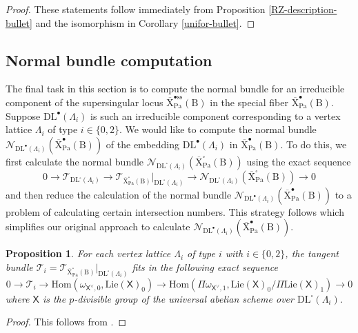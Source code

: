 \documentclass[10pt]{amsart}
\numberwithin{equation}{section}
\newtheorem{proposition}[equation]{Proposition}
\theoremstyle{definition}
\def\Lie{\mathrm{Lie}}
\def\Pa{\mathrm{Pa}}
\def\calN{\mathcal{N}}
\def\calT{\mathcal{T}}
\def\sfX{\mathsf{X}}
\def\rmB{\mathrm{B}}
\def\rmX{\mathrm{X}}
\begin{document}
\begin{proof}
These statements follow immediately from Proposition \ref{RZ-description-bullet} and the isomorphism in Corollary \ref{unifor-bullet}.
\end{proof}


\subsection{Normal bundle computation}
The final task in this section is to compute the normal bundle for an irreducible component of the supersingular locus $\overline{\rmX}^{\bullet\mathrm{ss}}_{\Pa}(\rmB)$ in the special fiber $\overline{\rmX}^{\bullet}_{\Pa}(\rmB)$. Suppose $\mathrm{DL}^{\bullet}(\Lambda_{i})$ is  such an irreducible component corresponding to a vertex lattice $\Lambda_{i}$ of type $i\in\{0, 2\}$. We would like to compute the normal bundle $\calN_{\mathrm{DL}^{\bullet}(\Lambda_{i})}({\overline{\rmX}^{\bullet}_{\Pa}(\rmB)})$ of the embedding $\mathrm{DL}^{\bullet}(\Lambda_{i})$ in $\overline{\rmX}^{\bullet}_{\Pa}(\rmB)$. To do this, we first calculate the normal bundle $\calN_{\mathrm{DL}^{\square}(\Lambda_{i})}({\overline{\rmX}^{\square}_{\Pa}(\rmB)})$ using the exact sequence 
\begin{equation*}
0\rightarrow \calT_{\mathrm{DL}^{\square}(\Lambda_{i})}\rightarrow \calT_{\overline{\rmX}^{\square}_{\Pa}(\rmB)}\vert_{\mathrm{DL}^{\square}(\Lambda_{i})}\rightarrow \calN_{\mathrm{DL}^{\square}(\Lambda_{i})}({\overline{\rmX}^{\square}_{\Pa}(\rmB)})\rightarrow 0
\end{equation*}
and then reduce the calculation of the normal bundle $ \calN_{\mathrm{DL}^{\bullet}(\Lambda_{i})}({\overline{\rmX}^{\bullet}_{\Pa}(\rmB)})$ to a problem of calculating certain intersection numbers. This strategy follows \cite[\S6.4]{Sweeting} which simplifies our original approach to calculate $\calN_{\mathrm{DL}^{\bullet}(\Lambda_{i})}({\overline{\rmX}^{\bullet}_{\Pa}(\rmB)})$.

\begin{proposition}\label{square-Tangent}
For each vertex lattice $\Lambda_{i}$ of type $i$ with $i\in\{0,2\}$, the tangent bundle $\calT_{i}=\calT_{\overline{\rmX}^{\square}_{\Pa}(\rmB)}\vert_{\mathrm{DL}^{\square}(\Lambda_{i})}$ fits in the following exact sequence
\begin{equation*}
0\rightarrow \calT_{i}\rightarrow \mathrm{Hom}(\omega_{\sfX^{\vee},0}, \Lie(\sfX)_{0})\rightarrow \mathrm{Hom}(\Pi\omega_{\sfX^{\vee},1}, \Lie(\sfX)_{0}/\Pi\Lie(\sfX)_{1})\rightarrow 0
\end{equation*}
where $\sfX$ is the $p$-divisible group of the universal abelian scheme over $\mathrm{DL}^{\square}(\Lambda_{i})$.
\end{proposition}
\begin{proof}
This follows from \cite[Theorem 6.3.7]{Sweeting}.
\end{proof}
\end{document}

